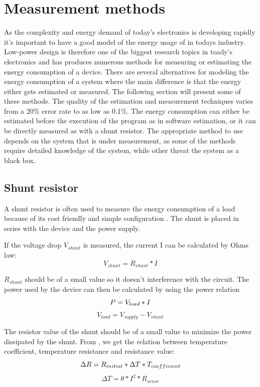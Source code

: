 \chapter{Measurement methods}
As the complexity and energy demand of today's electronics is developing rapidly it's  important to have a good model of the energy usage of in todays industry. Low-power design is therefore one of the biggest research topics in toady's electronics and has produces numerous methods for measuring or estimating the energy consumption of a device. There are several alternatives for modeling the energy consumption of a system where the main difference is that the energy either gets estimated or measured. The following section will present some of these methods. The quality of the estimation and measurement techniques varies from a 20\% error rate to as low as 0.1\%.  The energy consumption can either be estimated before the execution of the program as in software estimation, or it can be directly measured as with a shunt resistor. The appropriate method to use depends on the system that is under measurement, as some of the methods require detailed knowledge of the system, while other threat the system as a black box.
\section{Shunt resistor}
A shunt resistor is often used to measure the energy consumption of a load because of its cost friendly and simple configuration \cite{Intersil} \cite{Infineon} \cite{Vishay}. The shunt is placed in series with the device and the power supply.

If the voltage drop $V_{shunt}$ is measured, the current I can be calculated by Ohms law:\begin{equation}
V_{shunt}=R_{shunt}*I
\end{equation}

$R_{shunt}$ should be of a small value so it doesn't interference with the circuit. The power used by the device can then be calculated by using the power relation \begin{equation}
P=V_{load}*I \\
\end{equation}
\begin{equation}
V_{load}= V_{supply}-V_{shunt}
\end{equation}

 The resistor value of the shunt should be of a small value to minimize the power dissipated by the shunt. From \cite{Intersil}, we get the relation between temperature coefficient, temperature resistance and resistance value:
\begin{equation}
\Delta R= R_{initial}* \Delta T * T_{coefficient}\\
\label{rchange}
\end{equation}
\begin{equation}
 \Delta T = \theta * I^{2}*R_{sense}
\end{equation}

